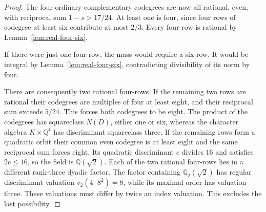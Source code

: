 \documentclass[11pt,reqno]{amsart}
\theoremstyle{remark}\newtheorem{remark}[theorem]{Remark}
\numberwithin{equation}{section}
\begin{document}
\begin{proof}
The four ordinary complementary codegrees are now all rational,
even, with reciprocal sum $1-s>17/24$. At least one is four,
since four rows of codegree at least six contribute at most $2/3$.
Every four-row is rational by Lemma~\ref{lem:real-four-six}.

If there were just one four-row, the mass would require a six-row.
It would be integral by Lemma~\ref{lem:real-four-six}, contradicting
divisibility of its norm by four.

There are consequently two rational four-rows. If the remaining
two rows are rational their codegrees are multiples of four at
least eight, and their reciprocal sum exceeds $5/24$. This forces
both codegrees to be eight. The product of the codegrees has
squareclass $N(D)$, either one or six, whereas the character algebra
$K\times\mathbb Q^4$ has discriminant squareclass three. If the
remaining rows form a quadratic orbit their common even codegree
is at least eight and the same reciprocal sum forces eight. Its
quadratic discriminant $c$ divides $16$ and satisfies $2c\le16$,
so the field is $\mathbb Q(\sqrt2)$. Each of the two rational
four-rows lies in a different rank-three dyadic factor. The factor
containing $\mathbb Q_2(\sqrt2)$ has regular discriminant valuation
$v_2(4\cdot8^2)=8$, while its maximal order has valuation three.
These valuations must differ by twice an index valuation. This
excludes the last possibility.
\end{proof}
\end{document}

